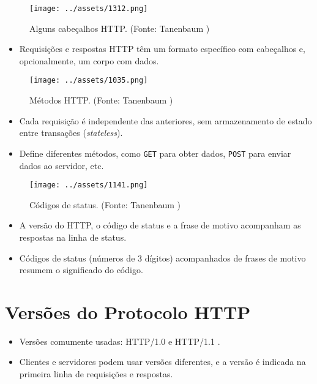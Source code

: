 \documentclass{article}
\begin{document}
\begin{figure}[h]
    \centering
    \texttt{[image: ../assets/1312.png]}
    \caption{Alguns cabeçalhos HTTP. (Fonte: Tanenbaum \cite{tanenbaum})}
\end{figure}

\begin{itemize}
    \item Requisições e respostas HTTP têm um formato específico com cabeçalhos e, opcionalmente, um corpo com dados.
\end{itemize}

\begin{figure}[h]
    \centering
    \texttt{[image: ../assets/1035.png]}
    \caption{Métodos HTTP. (Fonte: Tanenbaum \cite{tanenbaum})}
\end{figure}

\begin{itemize}
    \item Cada requisição é independente das anteriores, sem armazenamento de estado entre transações (\textit{stateless}).
    \item Define diferentes métodos, como \texttt{GET} para obter dados, \texttt{POST} para enviar dados ao servidor, etc.
\end{itemize}

\begin{figure}[h]
    \centering
    \texttt{[image: ../assets/1141.png]}
    \caption{Códigos de status. (Fonte: Tanenbaum \cite{tanenbaum})}
\end{figure}

\begin{itemize}
    \item A versão do HTTP, o código de status e a frase de motivo acompanham as respostas na linha de status.
    \item Códigos de status (números de 3 dígitos) acompanhados de frases de motivo resumem o significado do código.
\end{itemize}

\section{Versões do Protocolo HTTP}

\begin{itemize}
    \item Versões comumente usadas: HTTP/1.0 \cite{rfc1945} e HTTP/1.1 \cite{rfc2616}.
    \item Clientes e servidores podem usar versões diferentes, e a versão é indicada na primeira linha de requisições e respostas.
\end{itemize}
\end{document}
